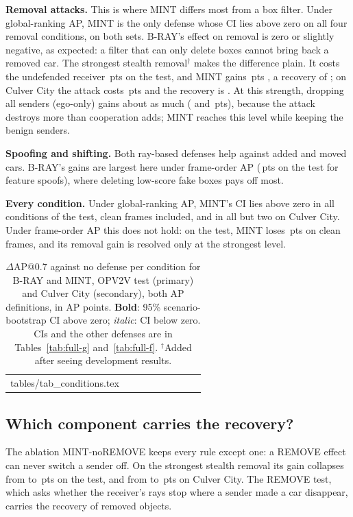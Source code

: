 \documentclass[conference]{IEEEtran}
\makeatletter
\newcommand{\mint}{MINT}
\newcommand{\pts}{\,pts}
\newcommand{\tabin}[1]{\@@input #1 }
\makeatother
\begin{document}
\textbf{Removal attacks.} This is where \mint{} differs most from a box filter. Under global-ranking AP, \mint{}
is the only defense whose CI lies above zero on all four removal conditions, on both sets. B-RAY's effect on
removal is zero or slightly negative, as expected: a filter that can only delete boxes cannot bring back a removed
car. The strongest stealth removal$^\dagger$ makes the difference plain. It costs the undefended receiver
\LossGlobPgdRemStStrong\pts{} on the test, and \mint{} gains \dGlobPgdRemStStrongMINT\pts{}
\ciGlobPgdRemStStrongMINT, a recovery of \RecGlobPgdRemStStrongMINT; on Culver City the attack costs
\CulLossGlobPgdRemStStrong\pts{} and the recovery is \CulRecGlobPgdRemStStrongMINT. At this strength, dropping all
senders (ego-only) gains about as much (\dGlobPgdRemStStrongEgo{} and \CulDGlobPgdRemStStrongEgo\pts), because the
attack destroys more than cooperation adds; \mint{} reaches this level while keeping the benign senders.

\textbf{Spoofing and shifting.} Both ray-based defenses help against added and moved cars. B-RAY's gains are
largest here under frame-order AP (\dFrameSpoofFeatBRAY\pts{} on the test for feature spoofs), where deleting
low-score fake boxes pays off most.

\textbf{Every condition.} Under global-ranking AP, \mint's CI lies above zero in all \NumConditions{} conditions
of the test, clean frames included, and in all but two on Culver City. Under frame-order AP this does not hold:
on the test, \mint{} loses \dFrameCleanMINT\pts{} on clean frames, and its removal gain is resolved only at the
strongest level.

\begin{table}[!t]
\caption{$\Delta$AP@0.7 against no defense per condition for B-RAY and \mint, OPV2V test (primary) and Culver
City (secondary), both AP definitions, in AP points. \textbf{Bold}: 95\% scenario-bootstrap CI above zero;
\textit{italic}: CI below zero. CIs and the other defenses are in Tables~\ref{tab:full-g} and~\ref{tab:full-f}.
$^\dagger$Added after seeing development results.}
\label{tab:conditions}
\centering
\footnotesize
\setlength{\tabcolsep}{4pt}
\begin{tabular}{lcccccccc}
\toprule
\tabin{tables/tab_conditions.tex}
\bottomrule
\end{tabular}
\end{table}

\subsection{Which component carries the recovery?}
\label{sec:ablation}
The ablation \mint-noREMOVE keeps every rule except one: a REMOVE effect can never switch a sender off. On the
strongest stealth removal its gain collapses from \dGlobPgdRemStStrongMINT{} to
\dGlobPgdRemStStrongMINTNoRem\pts{} on the test, and from \CulDGlobPgdRemStStrongMINT{} to
\CulDGlobPgdRemStStrongMINTNoRem\pts{} on Culver City. The REMOVE test, which asks whether the receiver's rays
stop where a sender made a car disappear, carries the recovery of removed objects.
\end{document}
